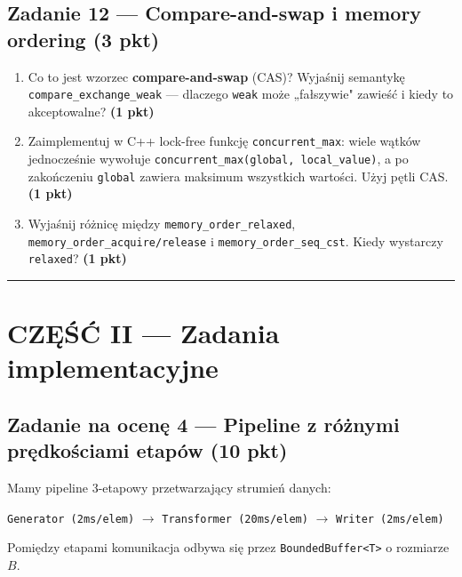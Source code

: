 \documentclass[11pt,a4paper]{article}
\newcommand{\pkt}[1]{\hfill\textbf{(#1 pkt)}}
\begin{document}
\subsection*{Zadanie 12 --- Compare-and-swap i memory ordering \pkt{3}}

\begin{enumerate}[label=(\alph*)]
\item Co to jest wzorzec \textbf{compare-and-swap} (CAS)? Wyjaśnij semantykę \texttt{compare\_exchange\_weak} --- dlaczego \texttt{weak} może „fałszywie" zawieść i kiedy to akceptowalne? \pkt{1}

\item Zaimplementuj w C++ lock-free funkcję \texttt{concurrent\_max}: wiele wątków jednocześnie wywołuje \texttt{concurrent\_max(global, local\_value)}, a po zakończeniu \texttt{global} zawiera maksimum wszystkich wartości. Użyj pętli CAS. \pkt{1}

\item Wyjaśnij różnicę między \texttt{memory\_order\_relaxed}, \texttt{memory\_order\_acquire/release} i \texttt{memory\_order\_seq\_cst}. Kiedy wystarczy \texttt{relaxed}? \pkt{1}
\end{enumerate}

\vspace{5mm}
\begin{center}
\rule{\textwidth}{0.8pt}
\end{center}
\vspace{3mm}

\section*{CZĘŚĆ II --- Zadania implementacyjne}

\subsection*{Zadanie na ocenę 4 --- Pipeline z różnymi prędkościami etapów \pkt{10}}

Mamy pipeline 3-etapowy przetwarzający strumień danych:
\begin{center}
\texttt{Generator (2ms/elem)} $\longrightarrow$ \texttt{Transformer (20ms/elem)} $\longrightarrow$ \texttt{Writer (2ms/elem)}
\end{center}
Pomiędzy etapami komunikacja odbywa się przez \texttt{BoundedBuffer<T>} o rozmiarze $B$.
\end{document}
